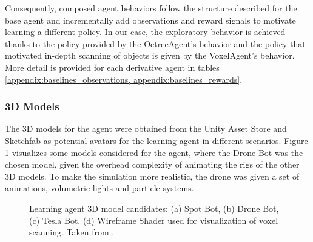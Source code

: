Consequently, composed agent behaviors follow the structure described for the base agent and incrementally add observations  and reward signals to motivate learning a different policy. In our case, the exploratory behavior is achieved thanks to the policy provided by the OctreeAgent's behavior and the policy that motivated in-depth scanning of objects is given by the VoxelAgent's behavior. More detail is provided for each derivative agent in tables \ref{appendix:baselines_observations, appendix:baselines_rewards}.


\subsubsection{3D Models}
The 3D models for the agent were obtained from the Unity Asset Store \cite{unity-asset-store} and Sketchfab \cite{sketchfab2021} as potential avatars for the learning agent in different scenarios. Figure \ref{fig:unity-drone} visualizes some models considered for the agent, where the Drone Bot was the chosen model, given the overhead complexity of animating the rigs of the other 3D models. To make the simulation more realistic, the drone was given a set of animations, volumetric lights and particle systems.

\begin{figure}[!ht]
    \centering
    \caption{Learning agent 3D model candidates: (a) Spot Bot, (b) Drone Bot, (c) Tesla Bot. (d) Wireframe Shader used for visualization of voxel scanning. Taken from \cite{unity-asset-store, sketchfab2021}.}
    \label{fig:unity-drone}
\end{figure}

